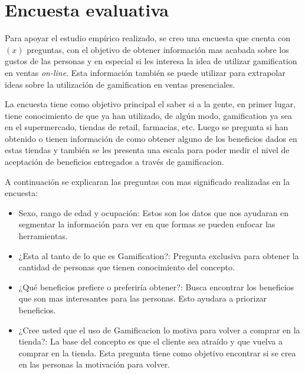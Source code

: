 \section{Encuesta evaluativa}

Para apoyar el estudio empírico realizado, se creo una encuesta que cuenta con $(x)$ preguntas, con el
objetivo de obtener información mas acabada sobre los gustos de las personas y en especial
si les interesa la idea de utilizar gamification en ventas \emph{on-line}. Esta información
también se puede utilizar para extrapolar ideas sobre la utilización de gamification en
ventas presenciales.

La encuesta tiene como objetivo principal el saber si a la gente, en primer lugar, tiene conocimiento
de que ya han utilizado, de algún modo, gamification ya sea en el supermercado, tiendas de retail,
farmacias, etc. Luego se pregunta si han obtenido o tienen información de como obtener alguno
de los beneficios dados en estas tiendas y también se les presenta una escala para poder medir
el nivel de aceptación de beneficios entregados a través de gamificacion.

A continuación se explicaran las preguntas con mas significado realizadas en la encuesta:
\begin{itemize}
\item Sexo, rango de edad y ocupación: Estos son los datos que nos ayudaran en segmentar
la información para ver en que formas se pueden enfocar las herramientas.
\item ¿Esta al tanto de lo que es Gamification?: Pregunta exclusiva para obtener la cantidad de
personas que tienen conocimiento del concepto.
\item ¿Qué beneficios prefiere o preferiría obtener?: Busca encontrar los beneficios que son
 mas interesantes para las personas. Esto ayudara a priorizar beneficios.
\item ¿Cree usted que el uso de Gamificacion lo motiva para volver a comprar en la tienda?: La
base del concepto es que el cliente sea atraído y que vuelva a comprar en la tienda. Esta pregunta
tiene como objetivo encontrar si se crea en las personas la motivación para volver.
\end{itemize}

